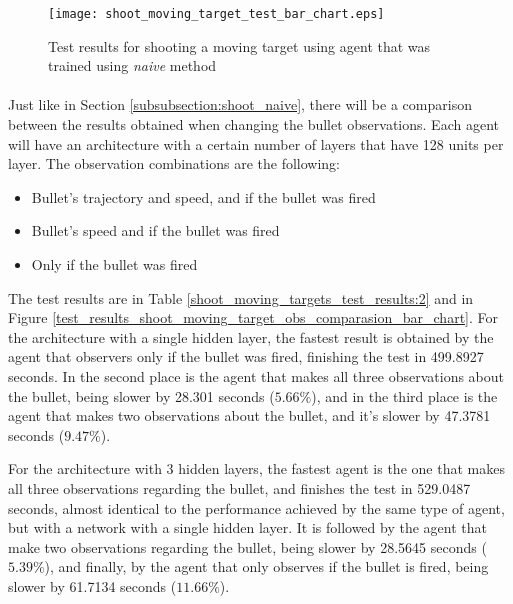 \begin{figure}
    \begin{center}
        \texttt{[image: shoot\_moving\_target\_test\_bar\_chart.eps]}
        \caption{Test results for shooting a moving target using agent that was trained using \emph{naive} method}
        \label{test_results_shoot_moving_target_bar_chart}
    \end{center}
\end{figure}



\paragraph{}
Just like in Section \ref{subsubsection:shoot_naive}, there will be a comparison between the results obtained when changing the bullet observations. Each agent will have an architecture with a certain number of layers that have 128 units per layer. The observation combinations are the following:
\begin{itemize}
    \item Bullet's trajectory and speed, and if the bullet was fired
    \item Bullet's speed and if the bullet was fired
    \item Only if the bullet was fired
\end{itemize}

The test results are in Table \ref{shoot_moving_targets_test_results:2} and in Figure \ref{test_results_shoot_moving_target_obs_comparasion_bar_chart}. For the architecture with a single hidden layer, the fastest result is obtained by the agent that observers only if the bullet was fired, finishing the test in 499.8927 seconds. In the second place is the agent that makes all three observations about the bullet, being slower by 28.301 seconds ($5.66\%$), and in the third place is the agent that makes two observations about the bullet, and it's slower by 47.3781 seconds ($9.47\%$).

For the architecture with 3 hidden layers, the fastest agent is the one that makes all three observations regarding the bullet, and finishes the test in 529.0487 seconds, almost identical to the performance achieved by the same type of agent, but with a network with a single hidden layer. It is followed by the agent that make two observations regarding the bullet, being slower by 28.5645 seconds ($5.39\%$), and finally, by the agent that only observes if the bullet is fired, being slower by 61.7134 seconds ($11.66\%$).

